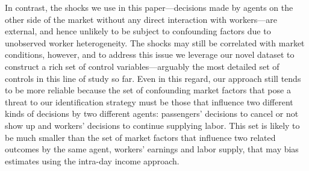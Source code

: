\documentclass[reviewmode]{restat}
\begin{document}
In contrast, the shocks we use in this paper---decisions made by agents on the other side of the market without
any direct interaction with workers---are external, and hence unlikely to be subject to confounding factors 
due to unobserved worker heterogeneity. The shocks may still be correlated with market conditions, however, 
and to address this issue we leverage our novel dataset to construct a rich set of control variables---arguably 
the most detailed set of controls in this line of study so far. Even in this regard, our approach still tends
to be more reliable because the set of confounding market factors that pose a threat to our identification 
strategy must be those that influence two different kinds of decisions by two different agents: passengers'
decisions to cancel or not show up and workers' decisions to continue supplying labor. This set is likely
to be much smaller than the set of market factors that influence two related outcomes by the same agent,
workers' earnings and labor supply, that may bias estimates using the intra-day income approach.


\end{document}
